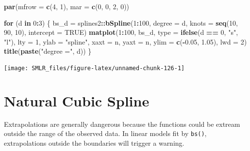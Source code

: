 \documentclass[
]{book}
\newenvironment{Shaded}{\begin{snugshade}}{\end{snugshade}}
\newcommand{\AttributeTok}[1]{\textcolor[rgb]{0.13,0.29,0.53}{#1}}
\newcommand{\ConstantTok}[1]{\textcolor[rgb]{0.56,0.35,0.01}{#1}}
\newcommand{\ControlFlowTok}[1]{\textcolor[rgb]{0.13,0.29,0.53}{\textbf{#1}}}
\newcommand{\DecValTok}[1]{\textcolor[rgb]{0.00,0.00,0.81}{#1}}
\newcommand{\FloatTok}[1]{\textcolor[rgb]{0.00,0.00,0.81}{#1}}
\newcommand{\FunctionTok}[1]{\textcolor[rgb]{0.13,0.29,0.53}{\textbf{#1}}}
\newcommand{\NormalTok}[1]{#1}
\newcommand{\OtherTok}[1]{\textcolor[rgb]{0.56,0.35,0.01}{#1}}
\newcommand{\SpecialCharTok}[1]{\textcolor[rgb]{0.81,0.36,0.00}{\textbf{#1}}}
\newcommand{\StringTok}[1]{\textcolor[rgb]{0.31,0.60,0.02}{#1}}
\theoremstyle{definition}
\theoremstyle{definition}
\theoremstyle{definition}
\theoremstyle{definition}
\theoremstyle{remark}
\begin{document}
\begin{Shaded}
\begin{Highlighting}[]
    \FunctionTok{par}\NormalTok{(}\AttributeTok{mfrow =} \FunctionTok{c}\NormalTok{(}\DecValTok{4}\NormalTok{, }\DecValTok{1}\NormalTok{), }\AttributeTok{mar =} \FunctionTok{c}\NormalTok{(}\DecValTok{0}\NormalTok{, }\DecValTok{0}\NormalTok{, }\DecValTok{2}\NormalTok{, }\DecValTok{0}\NormalTok{))}

    \ControlFlowTok{for}\NormalTok{ (d }\ControlFlowTok{in} \DecValTok{0}\SpecialCharTok{:}\DecValTok{3}\NormalTok{)}
\NormalTok{    \{}
\NormalTok{        bs\_d }\OtherTok{=}\NormalTok{ splines2}\SpecialCharTok{::}\FunctionTok{bSpline}\NormalTok{(}\DecValTok{1}\SpecialCharTok{:}\DecValTok{100}\NormalTok{, }\AttributeTok{degree =}\NormalTok{ d, }\AttributeTok{knots =} \FunctionTok{seq}\NormalTok{(}\DecValTok{10}\NormalTok{, }\DecValTok{90}\NormalTok{, }\DecValTok{10}\NormalTok{), }\AttributeTok{intercept =} \ConstantTok{TRUE}\NormalTok{)}
        \FunctionTok{matplot}\NormalTok{(}\DecValTok{1}\SpecialCharTok{:}\DecValTok{100}\NormalTok{, bs\_d, }\AttributeTok{type =} \FunctionTok{ifelse}\NormalTok{(d }\SpecialCharTok{==} \DecValTok{0}\NormalTok{, }\StringTok{"s"}\NormalTok{, }\StringTok{"l"}\NormalTok{), }\AttributeTok{lty =} \DecValTok{1}\NormalTok{, }\AttributeTok{ylab =} \StringTok{"spline"}\NormalTok{, }
                \AttributeTok{xaxt =} \StringTok{\textquotesingle{}n\textquotesingle{}}\NormalTok{, }\AttributeTok{yaxt =} \StringTok{\textquotesingle{}n\textquotesingle{}}\NormalTok{, }\AttributeTok{ylim =} \FunctionTok{c}\NormalTok{(}\SpecialCharTok{{-}}\FloatTok{0.05}\NormalTok{, }\FloatTok{1.05}\NormalTok{), }\AttributeTok{lwd =} \DecValTok{2}\NormalTok{)}
        \FunctionTok{title}\NormalTok{(}\FunctionTok{paste}\NormalTok{(}\StringTok{"degree ="}\NormalTok{, d))}
\NormalTok{    \}}
\end{Highlighting}
\end{Shaded}

\begin{center}\texttt{[image: SMLR\_files/figure-latex/unnamed-chunk-126-1]} \end{center}

\hypertarget{natural-cubic-spline}{%
\section{Natural Cubic Spline}\label{natural-cubic-spline}}

Extrapolations are generally dangerous because the functions could be extream outside the range of the observed data. In linear models fit by \texttt{bs()}, extrapolations outside the boundaries will trigger a warning.
\end{document}
